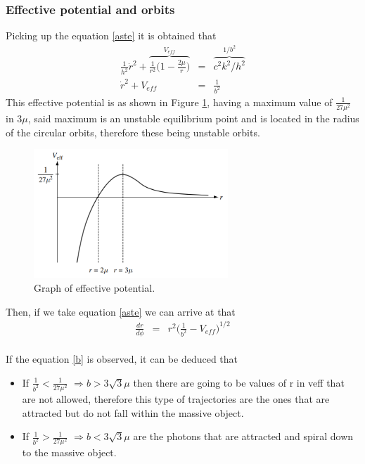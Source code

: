 \documentclass[letterpaper,11pt,onecolumn]{article}
\begin{document}
\subsubsection{Effective potential and orbits}
Picking up the equation \ref{aste} it is obtained that
\begin{eqnarray}
      \frac{1}{h^{2}}\dot{r}^{2}+\overbrace{\frac{1}{r^{2}}\Big( 1- \frac{2\mu}{r}\Big)}^{V_{eff}}&=& \overbrace{c^{2}k^{2}/h^{2}}^{1/b^{2}} \nonumber\\
      \dot{r}^{2}+V_{eff}&=& \frac{1}{b^{2}} \label{Veff}
\end{eqnarray}
    This effective potential is as shown in Figure \ref{fpot}, having a maximum value of $\frac{1}{ 27\mu^{2}}$ in $3\mu$, said maximum is an unstable equilibrium point and is located in the radius of the circular orbits, therefore these being unstable orbits.\\
 \begin{figure}[h!]
    \centering
    \includegraphics[width=0.65\textwidth]{Report/Images/3_poten.png}
    \caption{Graph of effective potential.}
\label{fpot}
\end{figure}
Then, if we take equation \ref{aste} we can arrive at that
\begin{eqnarray}
\frac{dr}{d\phi}&=&r^{2}\Big(\frac{1}{b^{2}}-V_{eff}\Big)^{1/2}\label{b}
\end{eqnarray}\\
If the equation \ref{b} is observed, it can be deduced that
\begin{itemize}
    \item If $\frac{1}{b^{2}}<\frac{1}{27\mu^{2}}$ $\Rightarrow b>3\sqrt{3}\mu$  then there are going to be values of r in veff that are not allowed, therefore this type of trajectories are the ones that are attracted but do not fall within the massive object.
    \item If $\frac{1}{b^{2}}>\frac{1}{27\mu^{2}}$ $\Rightarrow b<3\sqrt{3}\mu$ are the photons that are attracted and spiral down to the massive object.
\end{itemize}
\end{document}
